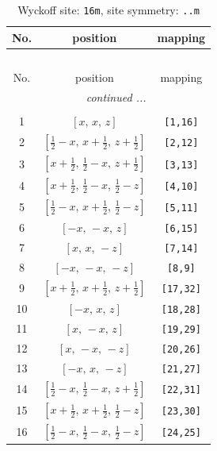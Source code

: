 \documentclass[fleqn,8pt]{jsarticle}
\begin{document}
\renewcommand{\arraystretch}{1.2}
\begin{longtable}{ccc}
\caption{Wyckoff site: {\tt 16m}, site symmetry: {\tt ..m}}
 \\
 \hline \hline
No. & position & mapping \\ \hline \endfirsthead

\multicolumn{2}{l}{\tablename\ \thetable{}} \\
 \hline \hline
No. & position & mapping \\ \hline \endhead

 \hline \hline
\multicolumn{2}{r}{\footnotesize\it continued ...} \\ \endfoot

 \hline \hline
\multicolumn{2}{r}{} \\ \endlastfoot

1 & $\left[ x,\, x,\, z \right]$ & {\tt [1,16]} \\ \hline
2 & $\left[ \frac{1}{2} - x,\, x + \frac{1}{2},\, z + \frac{1}{2} \right]$ & {\tt [2,12]} \\ \hline
3 & $\left[ x + \frac{1}{2},\, \frac{1}{2} - x,\, z + \frac{1}{2} \right]$ & {\tt [3,13]} \\ \hline
4 & $\left[ x + \frac{1}{2},\, \frac{1}{2} - x,\, \frac{1}{2} - z \right]$ & {\tt [4,10]} \\ \hline
5 & $\left[ \frac{1}{2} - x,\, x + \frac{1}{2},\, \frac{1}{2} - z \right]$ & {\tt [5,11]} \\ \hline
6 & $\left[ - x,\, - x,\, z \right]$ & {\tt [6,15]} \\ \hline
7 & $\left[ x,\, x,\, - z \right]$ & {\tt [7,14]} \\ \hline
8 & $\left[ - x,\, - x,\, - z \right]$ & {\tt [8,9]} \\ \hline
9 & $\left[ x + \frac{1}{2},\, x + \frac{1}{2},\, z + \frac{1}{2} \right]$ & {\tt [17,32]} \\ \hline
10 & $\left[ - x,\, x,\, z \right]$ & {\tt [18,28]} \\ \hline
11 & $\left[ x,\, - x,\, z \right]$ & {\tt [19,29]} \\ \hline
12 & $\left[ x,\, - x,\, - z \right]$ & {\tt [20,26]} \\ \hline
13 & $\left[ - x,\, x,\, - z \right]$ & {\tt [21,27]} \\ \hline
14 & $\left[ \frac{1}{2} - x,\, \frac{1}{2} - x,\, z + \frac{1}{2} \right]$ & {\tt [22,31]} \\ \hline
15 & $\left[ x + \frac{1}{2},\, x + \frac{1}{2},\, \frac{1}{2} - z \right]$ & {\tt [23,30]} \\ \hline
16 & $\left[ \frac{1}{2} - x,\, \frac{1}{2} - x,\, \frac{1}{2} - z \right]$ & {\tt [24,25]} \\
\end{longtable}
\end{document}
